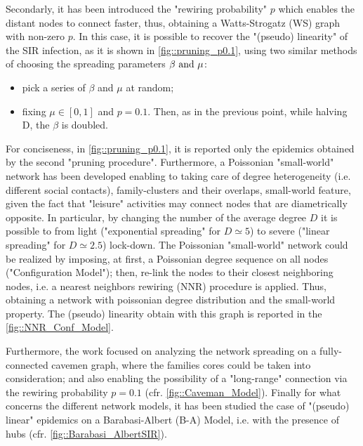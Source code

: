 \documentclass[11pt, a4paper, twoside]{article}
\begin{document}
Secondarly, it has been introduced the "rewiring probability" $p$ which enables the distant nodes to connect faster, thus, obtaining a Watts-Strogatz (WS) graph with non-zero $p$. In this case, it is possible to recover the "(pseudo) linearity" of the SIR infection, as it is shown in \autoref{fig::pruning_p0.1}, using two similar methods of choosing the spreading parameters $\beta \textnormal{ and } \mu$:
\begin{itemize}
	\item pick a series of $\beta$ and $\mu$ at random;
	\item fixing $\mu \in [0,1]$ and $p=0.1$. Then, as in the previous point, while halving D, the $\beta$ is doubled.
\end{itemize}
For conciseness, in \autoref{fig::pruning_p0.1}, it is reported only the epidemics obtained by the second "pruning procedure".
\newline
Furthermore, a Poissonian "small-world" network has been developed enabling to taking care of degree heterogeneity (i.e. different social contacts), family-clusters and their overlaps, small-world feature, given the fact that "leisure" activities may connect nodes that are diametrically opposite. In particular, by changing the number of the average degree $D$ it is possible to from light ("exponential spreading" for $D\simeq5$) to severe ("linear spreading" for  $D\simeq2.5$) lock-down.
The Poissonian "small-world" network could be realized by imposing, at first, a Poissonian degree sequence on all nodes ("Configuration Model"); then, re-link the nodes to their closest neighboring nodes, i.e. a nearest neighbors rewiring (NNR) procedure is applied. Thus, obtaining a network with poissonian degree distribution and the small-world property.
The (pseudo) linearity obtain with this graph is reported in the \autoref{fig::NNR_Conf_Model}.

Furthermore, the work focused on analyzing the network spreading on a fully-connected cavemen graph, where the families cores could be taken into consideration; and also enabling the possibility of a "long-range" connection via the rewiring probability $p = 0.1$ (cfr. \autoref{fig::Caveman_Model}). Finally for what concerns the different network models, it has been studied the case of "(pseudo) linear" epidemics on a Barabasi-Albert (B-A) Model, i.e. with the presence of hubs (cfr. \autoref{fig::Barabasi_AlbertSIR}).
\end{document}
